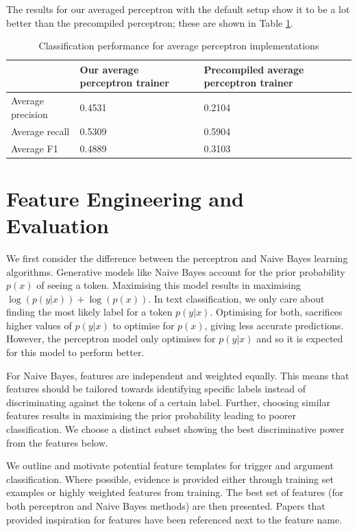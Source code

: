 \documentclass{article} %
\begin{document}
The results for our averaged perceptron with the default setup show it to be a lot better than the precompiled perceptron; these are shown in Table \ref{table:2_perf}.

\begin{table}[htb]
\centering
\caption{Classification performance for average perceptron implementations}
\label{table:2_perf}
\begin{tabular}{l|l|l|}
\cline{2-3}
                                        & Our average perceptron trainer & Precompiled average perceptron trainer \\ \hline
\multicolumn{1}{|l|}{Average precision} & 0.4531                       & 0.2104                    \\ \hline
\multicolumn{1}{|l|}{Average recall}    & 0.5309             & 0.5904                     \\ \hline
\multicolumn{1}{|l|}{Average F1}        & 0.4889            & 0.3103                    \\ \hline
\end{tabular}
\end{table}


\section{Feature Engineering and Evaluation}

We first consider the difference between the perceptron and Naive Bayes learning algorithms. Generative models like Naive Bayes account for the prior probability $p(x)$ of seeing a token. Maximising this model results in maximising $\log(p(y|x)) + \log(p(x))$. In text classification, we only care about finding the most likely label for a token $p(y|x)$. Optimising for both, sacrifices higher values of $p(y|x)$ to optimise for $p(x)$, giving less accurate predictions. However, the perceptron model only optimises for $p(y|x)$ and so it is expected for this model to perform better.

For Naive Bayes, features are independent and weighted equally. This means that features should be tailored towards identifying specific labels instead of discriminating against the tokens of a certain label. Further, choosing similar features results in maximising the prior probability leading to poorer classification. We choose a distinct subset showing the best discriminative power from the features below.

We outline and motivate potential feature templates for trigger and argument classification. Where possible, evidence is provided either through training set examples or highly weighted features from training. The best set of features (for both perceptron and Naive Bayes methods) are then presented.
Papers that provided inspiration for features have been referenced next to the feature name.
\end{document}
